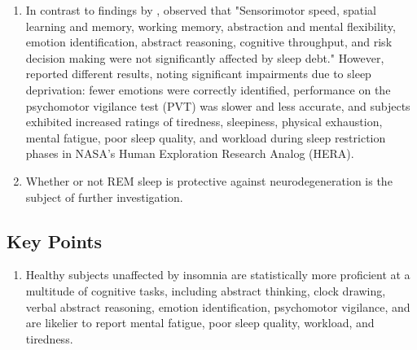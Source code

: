 \begin{enumerate}

	\item In contrast to findings by \cite{1}, \cite{5} observed that "Sensorimotor speed, spatial learning and memory, working memory, abstraction and mental flexibility, emotion identification, abstract reasoning, cognitive throughput, and risk decision making were not significantly affected by sleep debt." However, \cite{4} reported different results, noting significant impairments due to sleep deprivation: fewer emotions were correctly identified, performance on the psychomotor vigilance test (PVT) was slower and less accurate, and subjects exhibited increased ratings of tiredness, sleepiness, physical exhaustion, mental fatigue, poor sleep quality, and workload during sleep restriction phases in NASA’s Human Exploration Research Analog (HERA).

	\item Whether or not REM sleep is protective against neurodegeneration is the subject of further investigation.

\end{enumerate}

\begin{centering}\subsection{Key Points}\end{centering}

\begin{enumerate}

	\item Healthy subjects unaffected by insomnia are statistically more proficient at a multitude of cognitive tasks, including abstract thinking, clock drawing, verbal abstract reasoning, emotion identification, psychomotor vigilance, and are likelier to report mental fatigue, poor sleep quality, workload, and tiredness.

\end{enumerate}


